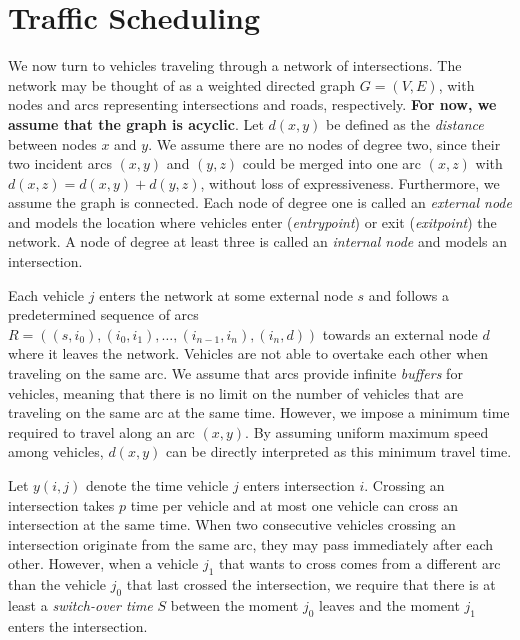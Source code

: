 \documentclass{article}
\begin{document}
\section{Traffic Scheduling}

We now turn to vehicles traveling through a network of intersections. The
network may be thought of as a weighted directed graph $G=(V,E)$, with nodes and
arcs representing intersections and roads, respectively. \textbf{For now, we
  assume that the graph is acyclic}. Let $d(x,y)$ be defined as the
\textit{distance} between nodes $x$ and $y$. We assume there are no nodes of
degree two, since their two incident arcs $(x,y)$ and $(y,z)$ could be merged
into one arc $(x,z)$ with $d(x,z) = d(x,y) + d(y,z)$, without loss of
expressiveness. Furthermore, we assume the graph is connected. Each node of
degree one is called an \textit{external node} and models the location where
vehicles enter (\textit{entrypoint}) or exit (\textit{exitpoint}) the network. A
node of degree at least three is called an \textit{internal node} and models an
intersection.

Each vehicle $j$ enters the network at some external node $s$ and follows a
predetermined sequence of arcs
$R = ((s,i_{0}), (i_{0},i_{1}), \dots, (i_{n-1},i_{n}), (i_{n},d))$ towards an
external node $d$ where it leaves the network. Vehicles are not able to overtake
each other when traveling on the same arc. We assume that arcs provide
infinite \textit{buffers} for vehicles, meaning that there is no limit on the
number of vehicles that are traveling on the same arc at the same time.
However, we impose a minimum time required to travel along an arc $(x,y)$. By
assuming uniform maximum speed among vehicles, $d(x,y)$ can be directly
interpreted as this minimum travel time.

Let $y(i,j)$ denote the time vehicle $j$ enters intersection $i$. Crossing an
intersection takes $p$ time per vehicle and at most one vehicle can cross an
intersection at the same time. When two consecutive vehicles crossing an
intersection originate from the same arc, they may pass immediately after each
other. However, when a vehicle $j_{1}$ that wants to cross comes from a
different arc than the vehicle $j_{0}$ that last crossed the intersection, we
require that there is at least a \textit{switch-over time} $S$ between the
moment $j_{0}$ leaves and the moment $j_{1}$ enters the intersection.
\end{document}
